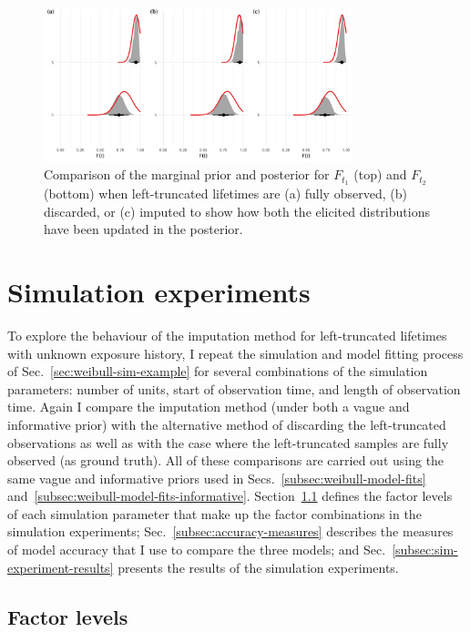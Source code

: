 \begin{figure}
    \centering
    \includegraphics[width=0.8\textwidth]{./figures/ch-2/prior-post-comp.pdf}
    \caption{Comparison of the marginal prior and posterior for $F_{t_1}$ (top) and $F_{t_2}$ (bottom) when left-truncated lifetimes are (a) fully observed, (b) discarded, or (c) imputed to show how both the elicited distributions have been updated in the posterior.}
    \label{fig:weibull-prior-post-comp}
\end{figure}

\section{Simulation experiments} \label{sec:weibull-sim-study}

To explore the behaviour of the imputation method for left-truncated lifetimes with unknown exposure history, I repeat the simulation and model fitting process of Sec.~\ref{sec:weibull-sim-example} for several combinations of the simulation parameters: number of units, start of observation time, and length of observation time. Again I compare the imputation method (under both a vague and informative prior) with the alternative method of discarding the left-truncated observations as well as with the case where the left-truncated samples are fully observed (as ground truth). All of these comparisons are carried out using the same vague and informative priors used in Secs.~\ref{subsec:weibull-model-fits} and~\ref{subsec:weibull-model-fits-informative}. Section~\ref{subsec:factor-lvls} defines the factor levels of each simulation parameter that make up the factor combinations in the simulation experiments; Sec.~\ref{subsec:accuracy-measures} describes the measures of model accuracy that I use to compare the three models; and Sec.~\ref{subsec:sim-experiment-results} presents the results of the simulation experiments.

\subsection{Factor levels} \label{subsec:factor-lvls}

